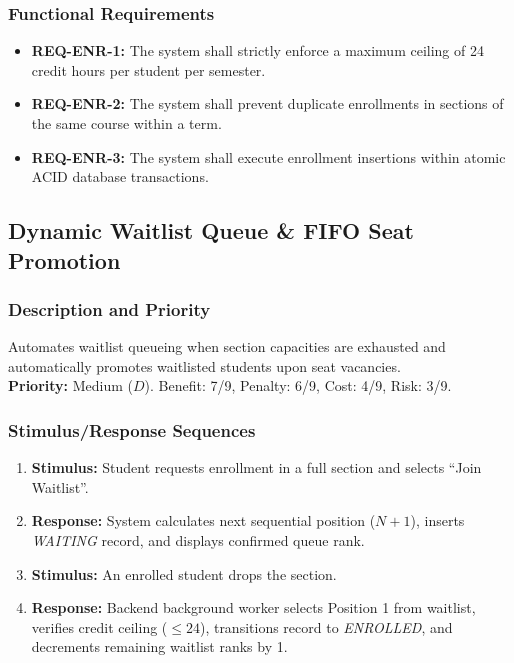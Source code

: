 \documentclass[a4paper,12pt]{article}
\begin{document}
\subsubsection{Functional Requirements}
\begin{itemize}[leftmargin=1.2cm]
    \item \textbf{REQ-ENR-1:} The system shall strictly enforce a maximum ceiling of 24 credit hours per student per semester.
    \item \textbf{REQ-ENR-2:} The system shall prevent duplicate enrollments in sections of the same course within a term.
    \item \textbf{REQ-ENR-3:} The system shall execute enrollment insertions within atomic ACID database transactions.
\end{itemize}

\subsection{Dynamic Waitlist Queue \& FIFO Seat Promotion}

\subsubsection{Description and Priority}
Automates waitlist queueing when section capacities are exhausted and automatically promotes waitlisted students upon seat vacancies. \\
\textbf{Priority:} Medium ($D$). Benefit: 7/9, Penalty: 6/9, Cost: 4/9, Risk: 3/9.

\subsubsection{Stimulus/Response Sequences}
\begin{enumerate}[leftmargin=1.2cm]
    \item \textbf{Stimulus:} Student requests enrollment in a full section and selects ``Join Waitlist''.
    \item \textbf{Response:} System calculates next sequential position ($N+1$), inserts \textit{WAITING} record, and displays confirmed queue rank.
    \item \textbf{Stimulus:} An enrolled student drops the section.
    \item \textbf{Response:} Backend background worker selects Position 1 from waitlist, verifies credit ceiling ($\le 24$), transitions record to \textit{ENROLLED}, and decrements remaining waitlist ranks by 1.
\end{enumerate}
\end{document}
